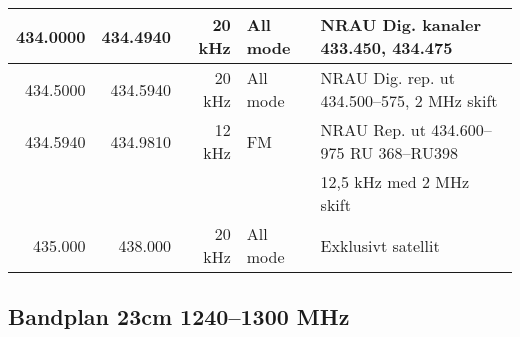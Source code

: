 \begin{tabular}{rrrll}
434.0000 & 434.4940 & 20 kHz  & All mode     & NRAU Dig. kanaler 433.450, 434.475                \\ \hline
434.5000 & 434.5940 & 20 kHz  & All mode     & NRAU Dig. rep. ut 434.500--575, 2 MHz skift       \\ \hline
434.5940 & 434.9810 & 12 kHz  & FM           & NRAU Rep. ut 434.600--975 RU 368--RU398           \\
         &          &         &              & 12,5 kHz med 2 MHz skift                          \\ \hline
435.000  & 438.000  & 20 kHz  & All mode     & Exklusivt satellit\\
\end{tabular}

\subsection{Bandplan 23cm 1240--1300 MHz}
